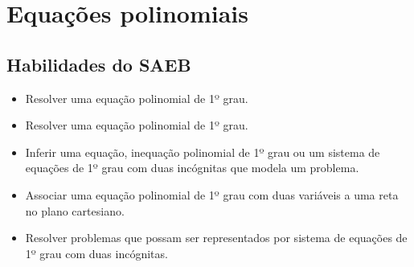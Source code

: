 

\chapter{Equações polinomiais}

\section{Habilidades do SAEB} 
\begin{itemize}
\item Resolver uma equação polinomial de 1º grau.
\item
 Resolver uma equação polinomial de 1º grau.
\item
  Inferir uma equação, inequação polinomial de 1º grau ou um sistema de
  equações de 1º grau com duas incógnitas que modela um problema.
\item
  Associar uma equação polinomial de 1º grau com duas variáveis a uma
  reta no plano cartesiano.
\item
  Resolver problemas que possam ser representados por sistema de
  equações de 1º grau com duas incógnitas.
\end{itemize}

